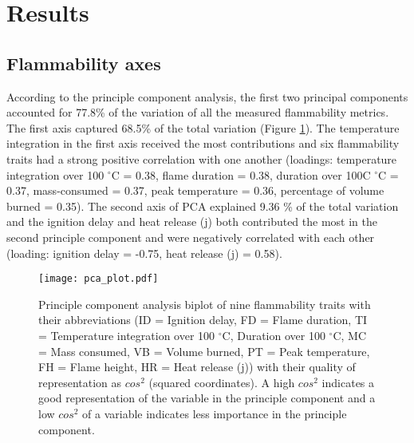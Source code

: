 \documentclass{ttuthes2007}
\begin{document}




\section{Results}

\subsection{Flammability axes}
According to the principle component analysis, the first two principal components accounted for 77.8\% of the variation of all the measured flammability metrics. The first axis %
captured 68.5\% of the total variation (Figure \ref{fig:pca-plot}). The temperature integration in the first axis received the most contributions and six flammability traits had a strong positive correlation with one another (loadings: temperature integration over 100 $^{\circ}$C = 0.38, flame duration = 0.38, duration over 100C $^{\circ}$C = 0.37, mass-consumed = 0.37, peak temperature  = 0.36, percentage of volume burned = 0.35). The second axis of PCA explained 9.36 \% of the total variation and the ignition delay and heat release (j) both contributed the most in the second principle component and were negatively correlated with each other (loading: ignition delay = -0.75, heat release (j) = 0.58). 

\begin{figure}  %
    \centering
    \texttt{[image: pca\_plot.pdf]}
    \caption[Principle components results]{\label{fig:pca-plot} Principle component analysis biplot of nine flammability traits with their abbreviations (ID = Ignition delay, FD = Flame duration, TI = Temperature integration over 100 $^{\circ}$C, Duration over 100 $^{\circ}$C, MC = Mass consumed, VB = Volume burned, PT = Peak temperature, FH = Flame height, HR = Heat release (j)) with their quality of representation as $cos^2$ (squared coordinates). A high $cos^2$ indicates a good representation of the variable in the principle component and a low $cos^2$ of a variable indicates less importance in the principle component.}
  \end{figure}
\end{document}
